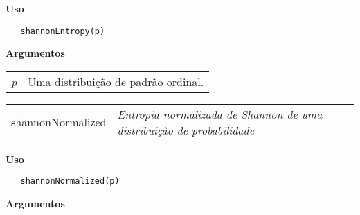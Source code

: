 \vspace{-0.5cm}

\hrulefill  

\vspace{0.5cm}

\textbf{Uso}

\begin{lstlisting}
   shannonEntropy(p)
\end{lstlisting}

\vspace{0.5cm}

\textbf{Argumentos}

\begin{table}[!ht]
\begin{center}
\begin{tabularx}{\textwidth}{X X}
\hspace{0.5cm} \textit{p} & Uma distribuição de padrão ordinal.\\
\end{tabularx}
\end{center}
\end{table} 

\newpage

\hrulefill   

\begin{table}[!ht]
\begin{center}
\begin{tabularx}{\textwidth}{ X X}
\hspace{0.5cm} shannonNormalized & \textit{Entropia normalizada de Shannon de uma distribuição de probabilidade}\\
\end{tabularx}
\end{center}
\end{table} 

\vspace{-0.5cm}

\hrulefill  

\vspace{0.5cm}

\textbf{Uso}

\begin{lstlisting}
   shannonNormalized(p)
\end{lstlisting}

\vspace{0.5cm}

\textbf{Argumentos}

